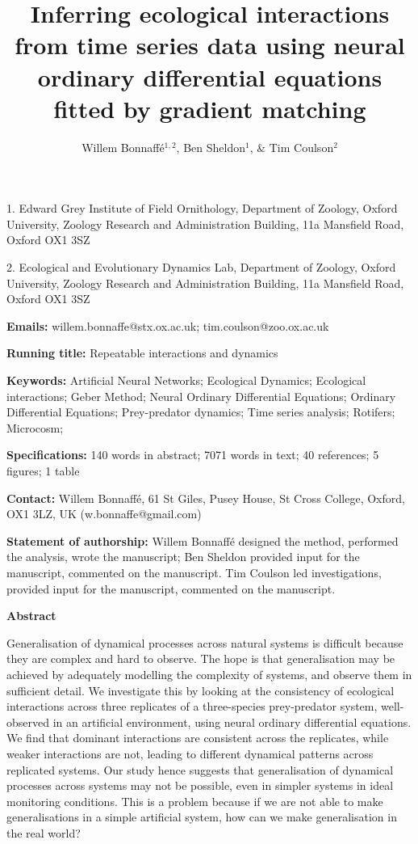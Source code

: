\documentclass[11pt, oneside]{article}
\title{Inferring ecological interactions from time series data using neural ordinary differential equations fitted by gradient matching}
\author{Willem Bonnaff\'e$^{1,2}$, Ben Sheldon$^1$, \& Tim Coulson$^2$}
\date{}
\begin{document}
\maketitle
{}

1. Edward Grey Institute of Field Ornithology, Department of Zoology, Oxford University, Zoology Research and Administration Building, 11a Mansfield Road, Oxford OX1 3SZ 

2. Ecological and Evolutionary Dynamics Lab, Department of Zoology, Oxford University, Zoology Research and Administration Building, 11a Mansfield Road, Oxford OX1 3SZ 

\textbf{Emails:}
willem.bonnaffe@stx.ox.ac.uk;
tim.coulson@zoo.ox.ac.uk

\textbf{Running title:}
Repeatable interactions and dynamics

\textbf{Keywords:}
Artificial Neural Networks;
Ecological Dynamics;  
Ecological interactions;
Geber Method; 
Neural Ordinary Differential Equations; 
Ordinary Differential Equations; 
Prey-predator dynamics; 
Time series analysis;
Rotifers;
Microcosm;


\textbf{Specifications:}  140 words in abstract; 7071 words in text; 40 references; 5 figures; 1 table

\textbf{Contact:}
Willem Bonnaff\'e, 61 St Giles, Pusey House, St Cross College, Oxford, OX1 3LZ, UK (w.bonnaffe@gmail.com)

\textbf{Statement of authorship:}
Willem Bonnaff\'e designed the method, performed the analysis, wrote the manuscript; 
Ben Sheldon provided input for the manuscript, commented on the manuscript.
Tim Coulson led investigations, provided input for the manuscript, commented on the manuscript.

\newpage
{}

\textbf{Abstract} 

Generalisation of dynamical processes across natural systems is difficult because they are complex and hard to observe.
The hope is that generalisation may be achieved by adequately modelling the complexity of systems, and observe them in sufficient detail.
We investigate this by looking at the consistency of ecological interactions across three replicates of a three-species prey-predator system, well-observed in an artificial environment, using neural ordinary differential equations.
We find that dominant interactions are consistent across the replicates, while weaker interactions are not, leading to different dynamical patterns across replicated systems.
Our study hence suggests that generalisation of dynamical processes across systems may not be possible, even in simpler systems in ideal monitoring conditions.
This is a problem because if we are not able to make generalisations in a simple artificial system, how can we make generalisation in the real world?
\end{document}
